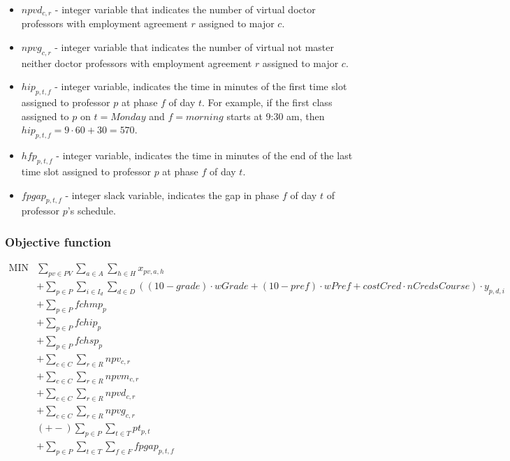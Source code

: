 \begin{itemize}
\item $npvd_{c,r}$ - integer variable that indicates the number of virtual doctor professors with employment agreement $r$ assigned to major $c$.
\item $npvg_{c,r}$ - integer variable that indicates the number of virtual not master neither doctor professors with employment agreement $r$ assigned to major $c$.
\item $hip_{p,t,f}$ - integer variable, indicates the time in minutes of the first time slot assigned to professor $p$ at phase $f$ of day $t$. For example, if the first class assigned to $p$ on $t=Monday$ and $f=morning$ starts at 9:30 am, then $hip_{p,t,f}=9\cdot 60 + 30 = 570$.
\item $hfp_{p,t,f}$ - integer variable, indicates the time in minutes of the end of the last time slot assigned to professor $p$ at phase $f$ of day $t$.
\item $fpgap_{p,t,f}$ - integer slack variable, indicates the gap in phase $f$ of day $t$ of professor $p$'s schedule.
\end{itemize}


\subsubsection{Objective function}

$$
\begin{array}{rl}
   \mbox{MIN} &
       \sum\limits_{pv \in PV} \sum\limits_{a \in A} \sum\limits_{h \in H} x_{pv,a,h}
      \\
      &
       + \sum\limits_{p \in P} \sum\limits_{i \in I_{d}} \sum\limits_{d \in D}
       ( ( 10 - grade ) \cdot wGrade + ( 10 - pref ) \cdot wPref + costCred \cdot nCredsCourse ) \cdot y_{p,d,i}
      \\
      &
       + \sum\limits_{p \in P} fchmp_{p}
      \\                 
      &
       + \sum\limits_{p \in P} fchip_{p}
      \\
      &
       + \sum\limits_{p \in P} fchsp_{p}
      \\
      &
       + \sum\limits_{c \in C} \sum\limits_{r \in R} npv_{c,r}
      \\   
      &
       + \sum\limits_{c \in C} \sum\limits_{r \in R} npvm_{c,r}
      \\   
      &
       + \sum\limits_{c \in C} \sum\limits_{r \in R} npvd_{c,r}
      \\               
      &
       + \sum\limits_{c \in C} \sum\limits_{r \in R} npvg_{c,r}
      \\                     
      &
       (+-) \sum\limits_{p \in P} \sum\limits_{t \in T} pt_{p,t}
      \\   
      &
      + \sum\limits_{p \in P} \sum\limits_{t \in T} \sum\limits_{f \in F} fpgap_{p,t,f}
\end{array}
$$



